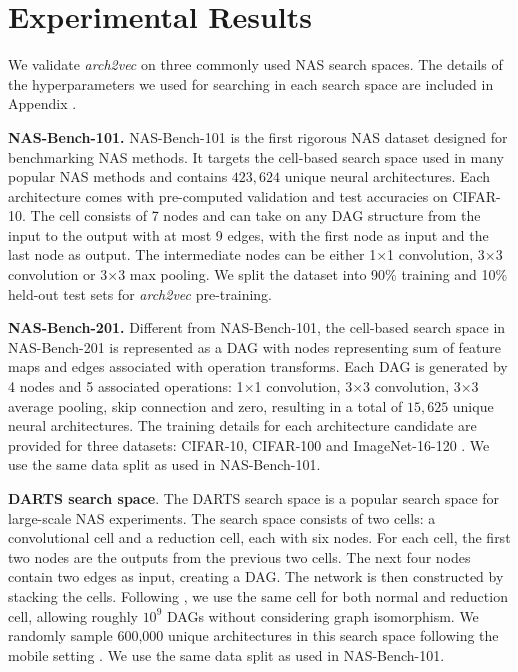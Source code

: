 \section{Experimental Results}
\label{sec.experiments}

We validate \textit{arch2vec} on three commonly used NAS search spaces. The details of the hyperparameters we used for searching in each search space are included in Appendix .


\textbf{NAS-Bench-101.} NAS-Bench-101 \cite{pmlr-v97-ying19a} is the first rigorous NAS dataset designed for benchmarking NAS methods. It targets the cell-based search space used in many popular NAS methods \cite{zoph2018learning,liu2018progressive,liu2018darts} and contains $423,624$ unique neural architectures. Each architecture comes with pre-computed validation and test accuracies on CIFAR-10. The cell consists of 7 nodes and can take on any DAG structure from the input to the output with at most 9 edges, with the first node as input and the last node as output. The intermediate nodes can be either 1$\times$1 convolution, 3$\times$3 convolution or 3$\times$3 max pooling. We split the dataset into 90\% training and 10\% held-out test sets for \textit{arch2vec} pre-training.

\textbf{NAS-Bench-201.} Different from NAS-Bench-101, the cell-based search space in NAS-Bench-201 \cite{dong2020nasbench201} is represented as a DAG with nodes representing sum of feature maps and edges associated with operation transforms. Each DAG is generated by 4 nodes and 5 associated operations: 1$\times$1 convolution, 3$\times$3 convolution, 3$\times$3 average pooling, skip connection and zero, resulting in a total of $15,625$ unique neural architectures. The training details for each architecture candidate are provided for three datasets: CIFAR-10, CIFAR-100 and ImageNet-16-120 \cite{tinyimagenet17}. We use the same data split as used in NAS-Bench-101.

\textbf{DARTS search space}. The DARTS search space \cite{liu2018darts} is a popular search
space for large-scale NAS experiments. The search space consists of two cells: a convolutional cell and a reduction cell, each with six nodes. For each cell, the first two nodes are the outputs from the previous two cells. The next four nodes contain two edges as input, creating a DAG. The network is then constructed by stacking the cells. Following \cite{liu2018progressive}, we use the same cell for both normal and reduction cell, allowing roughly $10^9$ DAGs without considering graph isomorphism. We randomly sample 600,000 unique architectures in this search space following the mobile setting \cite{liu2018darts}. We use the same data split as used in NAS-Bench-101. 


